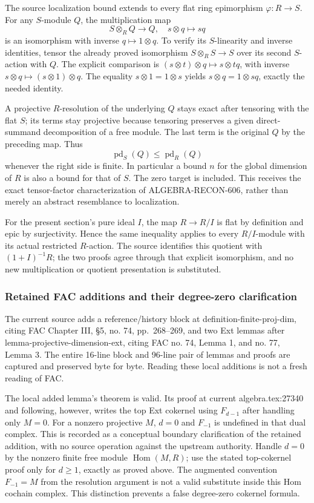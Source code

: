 The source localization bound extends to every flat ring epimorphism \(\varphi:R\to S\). For any \(S\)-module \(Q\), the multiplication map \[
S\otimes_RQ\longrightarrow Q,\quad s\otimes q\mapsto sq
\] is an isomorphism with inverse \(q\mapsto1\otimes q\). To verify its \(S\)-linearity and inverse identities, tensor the already proved isomorphism \(S\otimes_RS\to S\) over its second \(S\)-action with \(Q\). The explicit comparison is \((s\otimes t)\otimes q\mapsto s\otimes tq\), with inverse \(s\otimes q\mapsto(s\otimes1)\otimes q\). The equality \(s\otimes1=1\otimes s\) yields \(s\otimes q=1\otimes sq\), exactly the needed identity.

A projective \(R\)-resolution of the underlying \(Q\) stays exact after tensoring with the flat \(S\); its terms stay projective because tensoring preserves a given direct-summand decomposition of a free module. The last term is the original \(Q\) by the preceding map. Thus \[
\operatorname{pd}_S(Q)\le\operatorname{pd}_R(Q)
\] whenever the right side is finite. In particular a bound \(n\) for the global dimension of \(R\) is also a bound for that of \(S\). The zero target is included. This receives the exact tensor-factor characterization of ALGEBRA-RECON-606, rather than merely an abstract resemblance to localization.

For the present section's pure ideal \(I\), the map \(R\to R/I\) is flat by definition and epic by surjectivity. Hence the same inequality applies to every \(R/I\)-module with its actual restricted \(R\)-action. The source identifies this quotient with \((1+I)^{-1}R\); the two proofs agree through that explicit isomorphism, and no new multiplication or quotient presentation is substituted.

\subsubsection{Retained FAC additions and their degree-zero clarification}\label{algebra-proof-022-retained-fac-additions-and-their-degree-zero-clarification}

The current source adds a reference/history block at definition-finite-proj-dim, citing FAC Chapter III, §5, no. 74, pp.~268--269, and two Ext lemmas after lemma-projective-dimension-ext, citing FAC no. 74, Lemma 1, and no. 77, Lemma 3. The entire 16-line block and 96-line pair of lemmas and proofs are captured and preserved byte for byte. Reading these local additions is not a fresh reading of FAC.

The local added lemma's theorem is valid. Its proof at current algebra.tex:27340 and following, however, writes the top Ext cokernel using \(F_{d-1}\) after handling only \(M=0\). For a nonzero projective \(M\), \(d=0\) and \(F_{-1}\) is undefined in that dual complex. This is recorded as a conceptual boundary clarification of the retained addition, with no source operation against the upstream authority. Handle \(d=0\) by the nonzero finite free module \(\operatorname{Hom}(M,R)\); use the stated top-cokernel proof only for \(d\ge1\), exactly as proved above. The augmented convention \(F_{-1}=M\) from the resolution argument is not a valid substitute inside this Hom cochain complex. This distinction prevents a false degree-zero cokernel formula.

